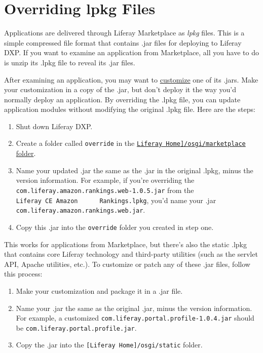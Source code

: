 \chapter{Overriding lpkg Files}\label{overriding-lpkg-files}

Applications are delivered through Liferay Marketplace as \emph{lpkg}
files. This is a simple compressed file format that contains .jar files
for deploying to Liferay DXP. If you want to examine an application from
Marketplace, all you have to do is unzip its .lpkg file to reveal its
.jar files.

After examining an application, you may want to
\href{/docs/7-2/customization/-/knowledge_base/c/liferay-customization}{customize}
one of its .jars. Make your customization in a copy of the .jar, but
don't deploy it the way you'd normally deploy an application. By
overriding the .lpkg file, you can update application modules without
modifying the original .lpkg file. Here are the steps:

\begin{enumerate}
\def\labelenumi{\arabic{enumi}.}
\item
  Shut down Liferay DXP.
\item
  Create a folder called \texttt{override} in the
  \href{/docs/7-2/deploy/-/knowledge_base/d/liferay-home}{\texttt{Liferay\ Home{]}/osgi/marketplace}
  folder}.
\item
  Name your updated .jar the same as the .jar in the original .lpkg,
  minus the version information. For example, if you're overriding the
  \texttt{com.liferay.amazon.rankings.web-1.0.5.jar} from the
  \texttt{Liferay\ CE\ Amazon\ \ \ \ \ \ Rankings.lpkg}, you'd name your
  .jar \texttt{com.liferay.amazon.rankings.web.jar}.
\item
  Copy this .jar into the \texttt{override} folder you created in step
  one.
\end{enumerate}

This works for applications from Marketplace, but there's also the
static .lpkg that contains core Liferay technology and third-party
utilities (such as the servlet API, Apache utilities, etc.). To
customize or patch any of these .jar files, follow this process:

\begin{enumerate}
\def\labelenumi{\arabic{enumi}.}
\item
  Make your customization and package it in a .jar file.
\item
  Name your .jar the same as the original .jar, minus the version
  information. For example, a customized
  \texttt{com.liferay.portal.profile-1.0.4.jar} should be
  \texttt{com.liferay.portal.profile.jar}.
\item
  Copy the .jar into the \texttt{{[}Liferay\ Home{]}/osgi/static}
  folder.
\end{enumerate}

